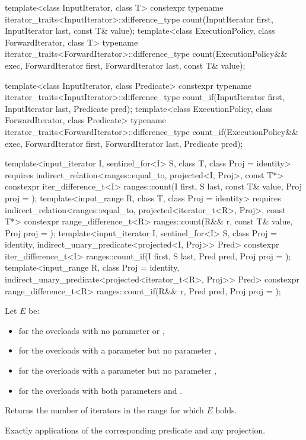 %
%
\begin{itemdecl}
template<class InputIterator, class T>
  constexpr typename iterator_traits<InputIterator>::difference_type
    count(InputIterator first, InputIterator last, const T& value);
template<class ExecutionPolicy, class ForwardIterator, class T>
  typename iterator_traits<ForwardIterator>::difference_type
    count(ExecutionPolicy&& exec,
          ForwardIterator first, ForwardIterator last, const T& value);

template<class InputIterator, class Predicate>
  constexpr typename iterator_traits<InputIterator>::difference_type
    count_if(InputIterator first, InputIterator last, Predicate pred);
template<class ExecutionPolicy, class ForwardIterator, class Predicate>
  typename iterator_traits<ForwardIterator>::difference_type
    count_if(ExecutionPolicy&& exec,
             ForwardIterator first, ForwardIterator last, Predicate pred);

template<input_iterator I, sentinel_for<I> S, class T, class Proj = identity>
  requires indirect_relation<ranges::equal_to, projected<I, Proj>, const T*>
  constexpr iter_difference_t<I>
    ranges::count(I first, S last, const T& value, Proj proj = {});
template<input_range R, class T, class Proj = identity>
  requires indirect_relation<ranges::equal_to, projected<iterator_t<R>, Proj>, const T*>
  constexpr range_difference_t<R>
    ranges::count(R&& r, const T& value, Proj proj = {});
template<input_iterator I, sentinel_for<I> S, class Proj = identity,
         indirect_unary_predicate<projected<I, Proj>> Pred>
  constexpr iter_difference_t<I>
    ranges::count_if(I first, S last, Pred pred, Proj proj = {});
template<input_range R, class Proj = identity,
         indirect_unary_predicate<projected<iterator_t<R>, Proj>> Pred>
  constexpr range_difference_t<R>
    ranges::count_if(R&& r, Pred pred, Proj proj = {});
\end{itemdecl}

\begin{itemdescr}
\pnum
Let $E$ be:
\begin{itemize}
\item
   for the overloads
  with no parameter  or ,
\item
   for the overloads
  with a parameter  but no parameter ,
\item
   for the overloads
  with a parameter  but no parameter ,
\item
   for the overloads
  with both parameters  and .
\end{itemize}

\pnum
\effects
Returns the number of iterators  in the range 
for which $E$ holds.

\pnum
\complexity
Exactly  applications
of the corresponding predicate and any projection.
\end{itemdescr}

